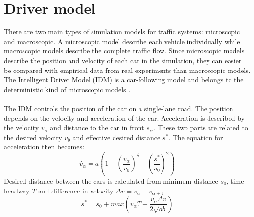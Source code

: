 \section{Driver model}
There are two main types of simulation models for traffic systems: microscopic
and macroscopic. A microscopic model describe each vehicle individually while macroscopic
models describe the complete traffic flow. Since microscopic models describe the position
and velocity of each car in the simulation, they can easier be compared with
empirical data from real experiments than macroscopic models. The Intelligent Driver Model (IDM)
is a car-following model and belongs to the deterministic kind of microscopic
models \cite{idm}.\\\\
The IDM controls the position of the car on a single-lane road. The position depends on the velocity and acceleration of the car. Acceleration is described by the velocity \begin{math}v_\alpha\end{math} and distance to the car in front \begin{math}s_\alpha\end{math}. These two parts are related to the desired velocity \begin{math}v_0\end{math} and effective desired distance \begin{math}s^\ast\end{math}. The equation for acceleration then becomes:
\begin{equation}\label{driver_acc}\dot{v_\alpha} = a\left
(1-(\frac{v_\alpha}{v_0})^\delta-(\frac{s^\ast}{s_0})^2 \right)\end{equation}
Desired distance between the cars is calculated from minimum distance \begin{math}s_0\end{math}, time headway \begin{math}T\end{math} and difference in velocity \begin{math}\Delta v = v_\alpha - v_{\alpha + 1}\end{math}.
\begin{equation}\label{desireddist}s^\ast = s_0 + max \left (v_\alpha T +
\frac{v_\alpha \Delta v}{2\sqrt{ab}}\right )\end{equation}
